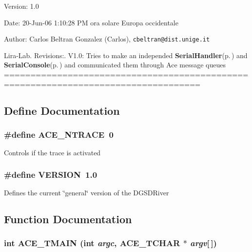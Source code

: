 \begin{Desc}
\item[Version:]1.0 \end{Desc}
\begin{Desc}
\item[Date:]20-Jun-06 1:10:28 PM ora solare Europa occidentale \end{Desc}
\begin{Desc}
\item[Author:]Carlos Beltran Gonzalez (Carlos), {\tt cbeltran@dist.unige.it} 

Lira-Lab. Revisions:. V1.0: Tries to make an independed {\bf Serial\-Handler}{\rm (p.\,\pageref{classSerialHandler})} and {\bf Serial\-Console}{\rm (p.\,\pageref{classSerialConsole})} and communicated them through Ace message queues ===================================================================================\end{Desc}


\subsection{Define Documentation}
\subsubsection{\setlength{\rightskip}{0pt plus 5cm}\#define ACE\_\-NTRACE\ 0}\label{DGSDriver_8cpp_a1}


Controls if the trace is activated 
\subsubsection{\setlength{\rightskip}{0pt plus 5cm}\#define VERSION\ 1.0}\label{DGSDriver_8cpp_a0}


Defines the current \char`\"{}general\char`\"{} version of the DGSDRiver 

\subsection{Function Documentation}
\subsubsection{\setlength{\rightskip}{0pt plus 5cm}int ACE\_\-TMAIN (int {\em argc}, ACE\_\-TCHAR $\ast$ {\em argv}[$\,$])}\label{DGSDriver_8cpp_a2}


